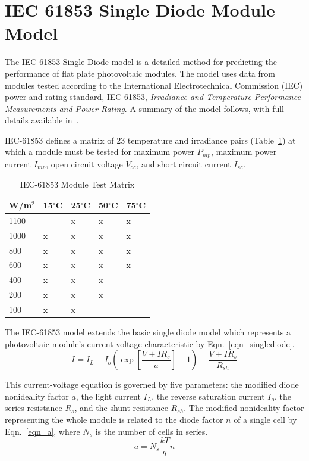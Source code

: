 \documentclass[12pt,letterpaper]{article}
\begin{document}
\section{IEC 61853 Single Diode Module Model}\label{sec-iecmodule}

The IEC-61853 Single Diode model is a detailed method for predicting the performance of flat plate photovoltaic modules.  The model uses data from modules tested according to the International Electrotechnical Commission (IEC) power and rating standard, IEC 61853, \textit{Irradiance and Temperature Performance Measurements and Power Rating}.  A summary of the model follows, with full details available in~\cite{dobos2014}.

IEC-61853 defines a matrix of 23 temperature and irradiance pairs (Table~\ref{tab_testmatrix}) at which a module must be tested for maximum power $P_{mp}$, maximum power current $I_{mp}$, open circuit voltage $V_{oc}$, and short circuit current $I_{sc}$. 

\begin{table}[h!]
\begin{center}
\begin{tabular}{lllll}
 W/m$^2$ & 15$^\circ$C & 25$^\circ$C & 50$^\circ$C & 75$^\circ$C \\
\hline
1100 & & x & x & x \\
1000 & x & x & x & x \\
800 & x & x & x & x \\
600 & x & x & x & x \\
400 & x & x & x &  \\
200 & x & x & x &  \\
100 & x & x &  &  \\
\end{tabular}
\caption{IEC-61853 Module Test Matrix}
\label{tab_testmatrix}
\end{center}
\end{table}

The IEC-61853 model extends the basic single diode model which represents a photovoltaic module's current-voltage characteristic by Eqn.~\ref{eqn_singlediode}.
\begin{equation}
I = I_L - I_o\left(\exp \left[\frac{V+IR_s}{a}\right]-1\right) - \frac{V+IR_s}{R_{sh}}
\label{eqn_singlediode}
\end{equation}

This current-voltage equation is governed by five parameters: the modified diode nonideality factor $a$, the light current $I_L$, the reverse saturation current $I_o$, the series resistance $R_s$, and the shunt resistance $R_{sh}$.  The modified nonideality factor representing the whole module is related to the diode factor $n$ of a single cell by Eqn.~\ref{eqn_a}, where $N_s$ is the number of cells in series.
\begin{equation}\label{eqn_a}
a = N_s\frac{kT}{q}n
\end{equation}
\end{document}
